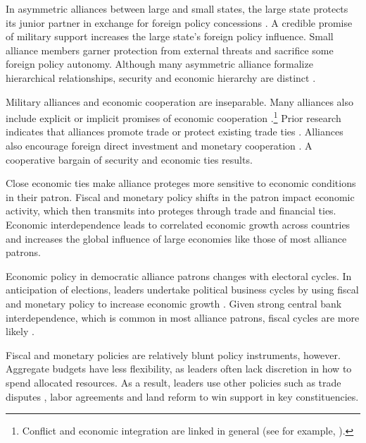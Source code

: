 \documentclass[12pt]{article}
\begin{document}
In asymmetric alliances between large and small states, the large state protects its junior partner in exchange for foreign policy concessions \citep{Morrow1991}.
A credible promise of military support increases the large state's foreign policy influence. 
Small alliance members garner protection from external threats and sacrifice some foreign policy autonomy. 
Although many asymmetric alliance formalize hierarchical relationships, security and economic hierarchy are distinct \citep{Lake2009}. 


Military alliances and economic cooperation are inseparable.
Many alliances also include explicit or implicit promises of economic cooperation \citep{GowaMansfield2004, LongLeeds2006, Davis2008, Poast2012}.\footnote{Conflict and economic integration are linked in general (see for example, \citep{GartzkeLi2003, Chen2021}).}
Prior research indicates that alliances promote trade \citep{Gowa1995, GowaMansfield2004, Haim2016} or protect existing trade ties \citep{Fordham2010}.
Alliances also encourage foreign direct investment \citep{LiVashchilko2010} and monetary cooperation \citep{Li2003}.
A cooperative bargain of security and economic ties results. 


Close economic ties make alliance proteges more sensitive to economic conditions in their patron.
Fiscal and monetary policy shifts in the patron impact economic activity, which then transmits into proteges through trade and financial ties. 
Economic interdependence leads to correlated economic growth across countries \citep{ArtisZhang1999, Kayser2006} and increases the global influence of large economies like those of most alliance patrons.


Economic policy in democratic alliance patrons changes with electoral cycles.
In anticipation of elections, leaders undertake political business cycles by using fiscal and monetary policy to increase economic growth \citep{Tufte1978, Rogoff1987}. 
Given strong central bank interdependence, which is common in most alliance patrons, fiscal cycles are more likely \citep{ClarkHallerberg2000}. 


Fiscal and monetary policies are relatively blunt policy instruments, however. 
Aggregate budgets have less flexibility, as leaders often lack discretion in how to spend allocated resources. 
As a result, leaders use other policies such as trade disputes \citep{Conconietal2017}, labor agreements \citep{Ahlquist2010} and land reform \cite{Philips2020} to win support in key constituencies. 
\end{document}
